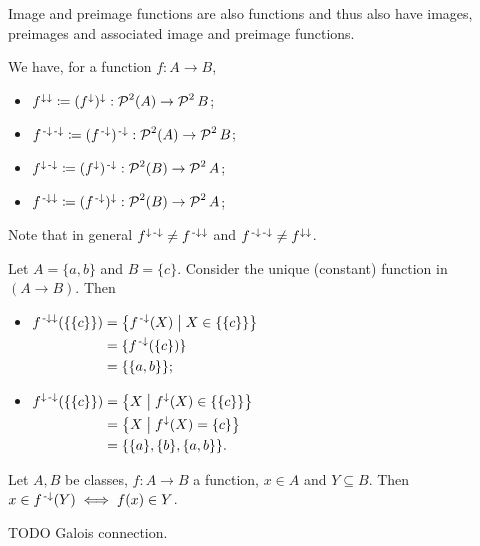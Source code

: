 Image and preimage functions are also functions and thus also have images, preimages and associated image and preimage functions.

We have, for a function $f:A\to B$,
\begin{itemize}
\item $f^{\imf\imf}\defeq (f^{\imf})^\imf: \powerset^2(A) \to \powerset^2{B}$;
\item $f^{\preimf\preimf}\defeq (f^{\preimf})^\preimf: \powerset^2(A) \to \powerset^2{B}$;
\item $f^{\imf\preimf}\defeq (f^{\imf})^\preimf: \powerset^2(B) \to \powerset^2{A}$;
\item $f^{\preimf\imf}\defeq (f^{\preimf})^\imf: \powerset^2(B) \to \powerset^2{A}$;
\end{itemize}

Note that in general $f^{\imf\preimf} \neq f^{\preimf\imf}$ and $f^{\preimf\preimf} \neq f^{\imf\imf}$.

\begin{example}
Let $A = \{a,b\}$ and $B = \{c\}$. Consider the unique (constant) function in $(A\to B)$. Then
\begin{itemize}
\item $\begin{aligned}[t]
f^{\preimf\imf}(\{\{c\}\}) &= \setbuilder{f^\preimf(X)}{X\in \{\{c\}\}} \\
&= \{f^\preimf(\{c\})\} \\
&= \{\{a,b\}\};
\end{aligned}$
\item $\begin{aligned}[t]
f^{\imf\preimf}(\{\{c\}\}) &= \setbuilder{X}{f^\imf(X)\in \{\{c\}\}} \\
&= \setbuilder{X}{f^\imf(X) = \{c\}} \\
&= \{ \{a\}, \{b\}, \{a,b\} \}.
\end{aligned}$
\end{itemize}
\end{example}

\begin{lemma}
Let $A,B$ be classes, $f:A\to B$ a function, $x\in A$ and $Y\subseteq B$. Then $x\in f^\preimf(Y) \iff f(x)\in Y$.
\end{lemma}
TODO Galois connection.

